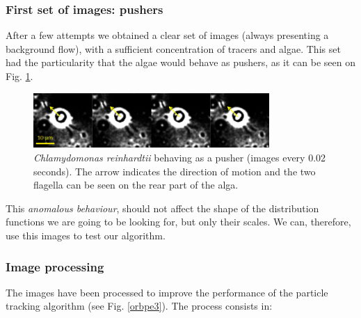 \subsubsection{First set of images: pushers}

After a few attempts we obtained a clear set of images (always presenting a background flow), with a sufficient concentration of tracers and algae. This set had the particularity that the algae would behave as pushers, as it can be seen on Fig. \ref{chlamy_pusher}. 

\begin{figure}[H]
	\centering
	\includegraphics[width=0.8\textwidth]{archivos/chlamy_pusher.png}
	\caption{\textit{Chlamydomonas reinhardtii} behaving as a pusher (images every 0.02 seconds). The arrow indicates the direction of motion and the two flagella can be seen on the rear part of the alga.}
	\label{chlamy_pusher}
\end{figure}

This \textit{anomalous behaviour}, should not affect the shape of the distribution functions we are going to be looking for, but only their scales. We can, therefore, use this images to test our algorithm.

\subsubsection{Image processing}

The images have been processed to improve the performance of the particle tracking algorithm (see Fig. \ref{orbpe3}). The process consists in:


